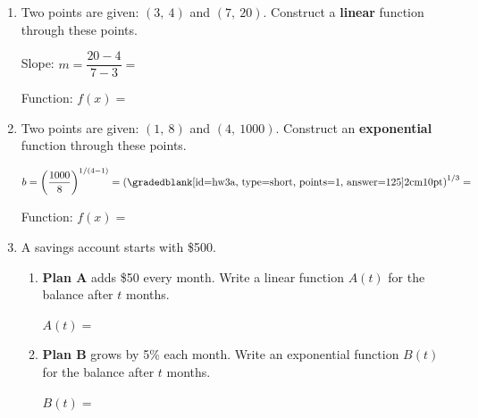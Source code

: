 \documentclass[10pt]{article}
\begin{document}
\begin{enumerate}[itemsep=16pt]
\begin{enumerate}[label=(\alph*), itemsep=12pt]
        Type: \smash{\gradedblank[id=hw1b3, type=short, check=text, points=1, answer={linear}]{3cm}{13pt}} \quad Formula: $f(x) = $ \smash{\gradedblank[id=hw1b4, type=short, points=2, answer={3x + 2}]{4cm}{13pt}}
      \end{enumerate}

\item Two points are given: $(3,\ 4)$ and $(7,\ 20)$. Construct a \textbf{linear} function
      through these points.

      \vspace{0.06in}
      Slope: $m = \dfrac{20 - 4}{7 - 3} = $ \smash{\gradedblank[id=hw2a, type=short, points=1, answer={4}]{2cm}{13pt}}

      \vspace{0.06in}
      Function: $f(x) = $ \smash{\gradedblank[id=hw2b, type=short, points=2, answer={4x - 8}]{6cm}{13pt}}

\item Two points are given: $(1,\ 8)$ and $(4,\ 1000)$. Construct an \textbf{exponential}
      function through these points.

      \vspace{0.06in}
      $b = \left(\dfrac{1000}{8}\right)^{1/(4-1)} = \left(\text{\smash{\gradedblank[id=hw3a, type=short, points=1, answer={125}]{2cm}{10pt}}}\right)^{1/3} = $ \smash{\gradedblank[id=hw3b, type=short, points=1, answer={5}]{2cm}{13pt}}

      \vspace{0.06in}
      Function: $f(x) = $ \smash{\gradedblank[id=hw3c, type=short, points=2, answer={1.6 \cdot 5^x}]{6cm}{13pt}}

\item A savings account starts with \$500.

      \begin{enumerate}[label=(\alph*), itemsep=8pt]
        \item \textbf{Plan A} adds \$50 every month. Write a linear function $A(t)$ for the balance
              after $t$ months.

              $A(t) = $ \smash{\gradedblank[id=hw4a, type=short, points=1, answer={500 + 50t}]{5cm}{13pt}}

        \item \textbf{Plan B} grows by 5\% each month. Write an exponential function $B(t)$ for
              the balance after $t$ months.

              $B(t) = $ \smash{\gradedblank[id=hw4b, type=short, points=1, answer={500 \cdot (1.05)^t}]{5cm}{13pt}}


\end{enumerate}
\end{enumerate}
\end{document}
